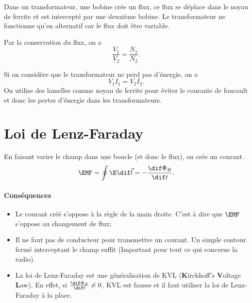 Dans un transformateur, une bobine crée un flux,
ce flux se déplace dans le noyau de ferrite
et est intercepté par une deuxième bobine.
Le transformateur ne fonctionne qu'en alternatif
car le flux doit être variable.

Par la conservation du flux, on a
\[ \frac{V_1}{V_2} = \frac{N_1}{N_2}. \]

Si on considère que le transformateur ne perd pas d'énergie, on a
\[ V_1I_1 = V_2I_2. \]
On utilise des lamelles comme noyau de ferrite pour éviter le
courants de foucault et donc les pertes d'énergie dans les transformateurs.

\section{Loi de Lenz-Faraday}
\label{sec:faraday}
En faisant varier le champ dans une boucle (et donc le flux),
on crée un courant.
\[ \EMF = \oint \E \dif \vec l = -\frac{\dif \Phi_B}{\dif t}. \]
\paragraph{Conséquences}
\begin{itemize}
  \item Le courant créé s'oppose à la règle de la main droite.
    C'est à dire que $\EMF$ s'oppose au changement de flux;
  \item Il ne faut pas de conducteur pour transmettre un courant.
    Un simple contour fermé interceptant le champ suffit
    (Important pour tout ce qui concerne la radio).
  \item La loi de Lenz-Faraday est une généralisation de KVL
    (\textbf{K}irchhoff's \textbf{V}oltage \textbf{L}aw).
    En effet, si $\frac{\dif \Phi_B}{\dif t} \neq 0$,
    KVL est fausse et il faut utiliser la loi de Lenz-Faraday à la place.
\end{itemize}

